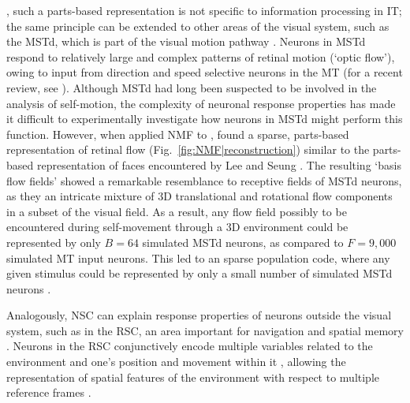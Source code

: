 , such a parts-based representation is not specific to
information processing in \ac{IT};
the same principle can be extended to other areas of the visual system,
such as the \ac{MSTd},
which is part of the visual motion pathway \cite{Beyeler2016}.
Neurons in \ac{MSTd} respond to relatively large and complex patterns
of retinal motion (`optic flow'),
owing to input from direction and speed selective neurons in the \ac{MT}
(for a recent review, see \cite{Orban2007}).
Although \ac{MSTd} had long been suspected to be involved in the
analysis of self-motion,
the complexity of neuronal response properties has made it difficult
to experimentally investigate how neurons in \ac{MSTd}
might perform this function.
However, when  
applied \ac{NMF} to 
\cite{Beyeler2016},
 found a sparse, parts-based representation of retinal flow
(Fig.~\ref{fig:NMF|reconstruction})
similar to the parts-based representation of faces
encountered by Lee and Seung \cite{LeeSeung1999}.
The resulting `basis flow fields' showed a remarkable resemblance to receptive fields
of \ac{MSTd} neurons, as they 
an intricate mixture of
3D translational and rotational flow components
in a subset of the visual field.
As a result, any flow field possibly to be encountered 
during self-movement through a 3D environment
could be represented by only $B = 64$ simulated \ac{MSTd} neurons,
as compared to $F = 9,000$ simulated \ac{MT} input neurons.
This led to an sparse  population code,
where any given stimulus could be represented
by only a small number of simulated \ac{MSTd} neurons
\cite{Beyeler2016}.

Analogously, \ac{NSC} can explain response properties
of neurons outside the visual system, 
such as in the \ac{RSC}, an area important for navigation and spatial memory \cite{Miller2014,Nelson2015,VannAggleton2009}.
Neurons in the \ac{RSC} conjunctively encode multiple variables related to the environment and one's position and movement within it
,
allowing the representation of spatial features of the environment 
with respect to multiple reference frames \cite{AlexanderNitz2015}.

